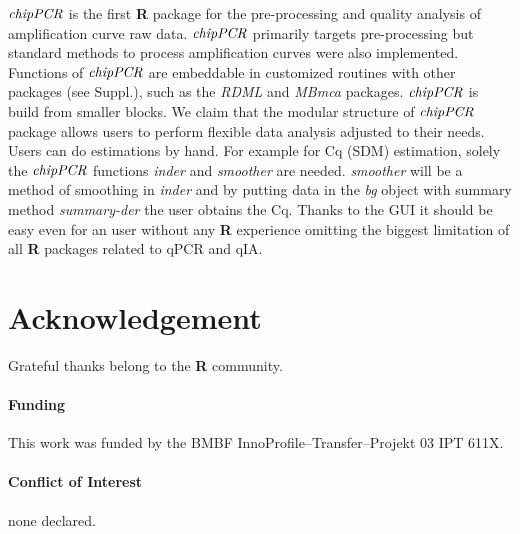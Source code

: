 \documentclass{bioinfo}
\begin{document}
$\emph{chipPCR}$ 
is the first \textbf{R} package for the pre-processing and quality 
analysis of amplification curve raw data. $\emph{chipPCR}$ 
primarily targets pre-processing but standard methods to process 
amplification curves were also implemented. Functions of $\emph{chipPCR}$ are embeddable in 
customized routines with other packages (see Suppl.), such as the \emph{RDML} and \emph{MBmca} packages. 
$\emph{chipPCR}$ is build from smaller blocks. We claim that the modular 
structure of $\emph{chipPCR}$ package allows users to perform flexible data 
analysis adjusted to their needs. Users can do estimations by hand. For example 
for Cq (SDM) estimation, solely 
the $\emph{chipPCR}$ functions \textsl{inder} and \textsl{smoother} are needed. 
\textsl{smoother} will be a method of smoothing in \textsl{inder} and by putting 
data in the \textsl{bg} object with summary method \textsl{summary-der} the user 
obtains the Cq. Thanks to the GUI it should be easy even for an user without 
any \textbf{R} experience omitting the biggest limitation of all \textbf{R} 
packages related to qPCR and qIA.


\section*{Acknowledgement}
\begin{methods}
Grateful thanks belong to the \textbf{R} community.

\paragraph{Funding\textcolon} This work was funded by the BMBF InnoProfile--Transfer--Projekt 03 IPT 611X.

\paragraph{Conflict of Interest\textcolon} none declared.
\end{methods}


%
%
%
%
%
%
%

\end{document}
